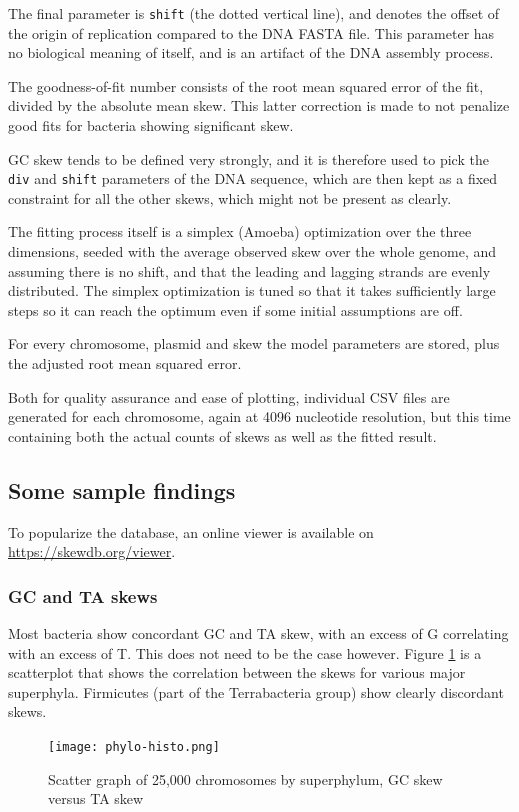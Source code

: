 \documentclass[fleqn,10pt]{wlscirep}
\begin{document}
The final parameter is {\tt shift} (the dotted vertical line), and denotes the offset of the origin of replication compared to the DNA FASTA file. This parameter has no biological meaning of  itself, and is an artifact of the DNA assembly process. 

The goodness-of-fit number consists of the root mean squared error of the fit, divided by the absolute mean skew. This latter correction is made to not penalize good fits for bacteria showing significant skew.

GC skew tends to be defined very strongly, and it is therefore used to pick the {\tt div} and {\tt shift} parameters of the DNA sequence, which are then kept as a fixed constraint for all the other skews, which might not be present as clearly.

The fitting process itself is a simplex (Amoeba) optimization over the three dimensions, seeded with the average observed skew over the whole genome, and assuming there is no shift, and that the leading and lagging strands are evenly distributed. The simplex optimization is tuned so that it takes sufficiently large steps so it can reach the optimum even if some initial assumptions are off.

For every chromosome, plasmid and skew the model parameters are stored, plus the adjusted root mean squared error.

Both for quality assurance and ease of plotting, individual CSV files are generated for each chromosome, again at 4096 nucleotide resolution, but this time containing both the actual counts of skews as well as the fitted result.
  
\subsection*{Some sample findings}
To popularize the database, an online viewer is available on \url{https://skewdb.org/viewer}.
\subsubsection*{GC and TA skews}
Most bacteria show concordant GC and TA skew, with an excess of G correlating with an excess of T. This does not need to be the case however. Figure \ref{fig:gc-ta-scatter} is a scatterplot that shows the correlation between the skews for various major superphyla. Firmicutes (part of the Terrabacteria group) show clearly discordant skews.

\begin{figure}[ht]
\centering
\texttt{[image: phylo-histo.png]}
\caption{Scatter graph of 25,000 chromosomes by superphylum, GC skew versus TA skew}
\label{fig:gc-ta-scatter}
\end{figure}
\end{document}
